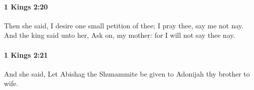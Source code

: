		\paragraph{1 Kings 2:20} %
			\label{1KINGS-2-20}

			Then she said, I desire one small petition of thee; I pray thee, say me not nay. And the king said unto her, Ask on, my mother: for I will not say thee nay.


		\paragraph{1 Kings 2:21} %
			\label{1KINGS-2-21}

			And she said, Let Abishag the Shunammite be given to Adonijah thy brother to wife.


